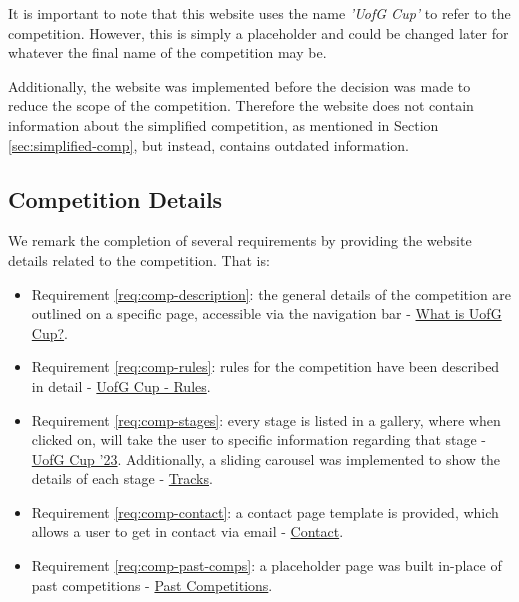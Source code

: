 \documentclass{l4proj}
\begin{document}
It is important to note that this website uses the name \textit{'UofG Cup'} to refer to the competition. However, this is simply a placeholder and could be changed later for whatever the final name of the competition may be. 

Additionally, the website was implemented before the decision was made to reduce the scope of the competition. Therefore the website does not contain information about the simplified competition, as mentioned in Section \ref{sec:simplified-comp}, but instead, contains outdated information.

\subsection{Competition Details}
We remark the completion of several requirements by providing the website details related to the competition. That is:

\begin{itemize}
    \item Requirement \ref{req:comp-description}: the general details of the competition are outlined on a specific page, accessible via the navigation bar - \href{https://robot-competition.github.io/robot-competition/what_is_uofg_cup.html}{What is UofG Cup?}.
    \item Requirement \ref{req:comp-rules}: rules for the competition have been described in detail - \href{https://robot-competition.github.io/robot-competition/rules.html}{UofG Cup - Rules}.
    \item Requirement \ref{req:comp-stages}: every stage is listed in a gallery, where when clicked on, will take the user to specific information regarding that stage - \href{https://robot-competition.github.io/robot-competition/uofg_cup_23.html}{UofG Cup '23}. Additionally, a sliding carousel was implemented to show the details of each stage - \href{https://robot-competition.github.io/robot-competition/tracks.html}{Tracks}.
    \item Requirement \ref{req:comp-contact}: a contact page template is provided, which allows a user to get in contact via email - \href{https://robot-competition.github.io/robot-competition/contact.html}{Contact}.
    \item Requirement \ref{req:comp-past-comps}: a placeholder page was built in-place of past competitions - \href{https://robot-competition.github.io/robot-competition/past_competitions.html}{Past Competitions}.
\end{itemize}
\end{document}
